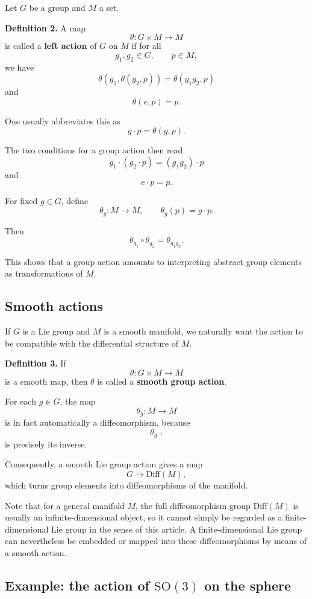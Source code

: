\documentclass[11pt]{article}
\begin{document}
Let $G$ be a group and $M$ a set.

\textbf{Definition 2.}
A map
\[
\theta:G\times M\to M
\]
is called a \textbf{left action} of $G$ on $M$ if for all
\[
g_1,g_2\in G,
\qquad
p\in M,
\]
we have
\[
\theta(g_1,\theta(g_2,p))
=
\theta(g_1g_2,p)
\]
and
\[
\theta(e,p)=p.
\]

One usually abbreviates this as
\[
g\cdot p=\theta(g,p).
\]

The two conditions for a group action then read
\[
g_1\cdot(g_2\cdot p)
=
(g_1g_2)\cdot p
\]
and
\[
e\cdot p=p.
\]

For fixed $g\in G$, define
\[
\theta_g:M\to M,
\qquad
\theta_g(p)=g\cdot p.
\]

Then
\[
\theta_{g_1}\circ\theta_{g_2}
=
\theta_{g_1g_2}.
\]

This shows that a group action amounts to interpreting abstract group elements as transformations of $M$.


\subsection{Smooth actions}

If $G$ is a Lie group and $M$ is a smooth manifold, we naturally want the action to be compatible with the differential structure of $M$.

\textbf{Definition 3.}
If
\[
\theta:G\times M\to M
\]
is a smooth map, then $\theta$ is called a \textbf{smooth group action}.

For each $g\in G$, the map
\[
\theta_g:M\to M
\]
is in fact automatically a diffeomorphism, because
\[
\theta_{g^{-1}}
\]
is precisely its inverse.

Consequently, a smooth Lie group action gives a map
\[
G\longrightarrow\mathrm{Diff}(M),
\]
which turns group elements into diffeomorphisms of the manifold.

Note that for a general manifold $M$, the full diffeomorphism group $\mathrm{Diff}(M)$ is usually an infinite-dimensional object, so it cannot simply be regarded as a finite-dimensional Lie group in the sense of this article. A finite-dimensional Lie group can nevertheless be embedded or mapped into these diffeomorphisms by means of a smooth action.


\subsection{Example: the action of $\mathrm{SO}(3)$ on the sphere}
\end{document}
